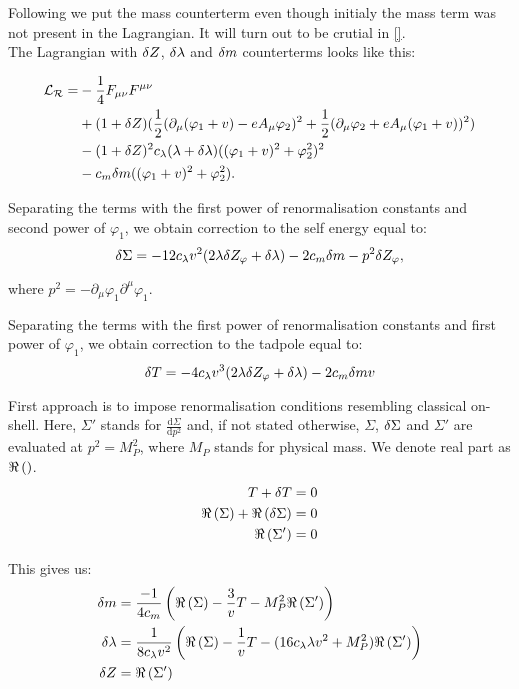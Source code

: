 Following \cite{Coleman1973} we put the mass counterterm even though initialy the mass term 
was not present in the Lagrangian. It will turn out to be crutial in \ref{}. \\ 
The Lagrangian with $\delta Z$, $\delta\lambda$ and $\delta m$ counterterms looks like this:

\begin{align}
\mathcal{L_R} = &-\frac{1}{4}F_{\mu\nu}F^{\mu\nu} \\
&+(1+ \delta Z)(\frac{1}{2}(\partial_\mu(\varphi_1+v) - eA_\mu\varphi_2)^2
+\frac{1}{2}(\partial_\mu\varphi_2+eA_\mu(\varphi_1+v))^2) \notag \\
&-(1+\delta Z)^2c_\lambda(\lambda+\delta\lambda)((\varphi_1+v)^2+\varphi_2^2)^2  \notag \\
&-c_m\delta m((\varphi_1+v)^2+\varphi_2^2).
\end{align}


Separating the terms with the first power of renormalisation constants and second power of 
$\varphi_1$, we obtain correction to the self energy equal to:
\begin{equation}
\delta\Sigma=-12c_\lambda v^2(2\lambda\delta Z_\varphi+\delta\lambda)-2c_m\delta m-p^2\delta Z_\varphi,
\end{equation}

where $p^2 = -\partial_\mu \varphi_1\partial^\mu\varphi_1$.


Separating the terms with the first power of renormalisation constants and first power of 
$\varphi_1$, we obtain correction to the tadpole equal to:
\begin{equation}
\delta T=-4c_\lambda v^3(2\lambda\delta Z_\varphi+\delta\lambda)-2c_m\delta m v
\end{equation}



First approach is to impose renormalisation conditions resembling classical on-shell.
Here, $\Sigma'$ stands for $\frac{\textrm{d}\Sigma}{\textrm{d}p^2}$ and, if not 
stated otherwise, 
$\Sigma$, $\delta\Sigma$ and $\Sigma'$ are evaluated at $p^2 = M_P^2$, where 
$M_P$ stands for physical mass. We denote real part as $\Re\left(\right)$.
\begin{align}
T+\delta T &= 0 \\
\Re\left(\Sigma\right) + \Re\left(\delta\Sigma\right) &= 0 \\
\Re\left(\Sigma'\right) &= 0
\end{align}

This gives us:
\begin{align}
\delta m &= \frac{-1}{4c_m}\left(\Re\left(\Sigma\right)-\frac{3}{v}T-M_P^2\Re\left(\Sigma'\right)
\right)\\
\delta\lambda &= \frac{1}{8c_\lambda v^2}\left(\Re\left(\Sigma\right)-\frac{1}{v}T-(16c_\lambda\lambda v^2+M_P^2)
\Re\left(\Sigma'\right)
\right)\\
\delta Z &= \Re\left(\Sigma'\right)
\end{align}

